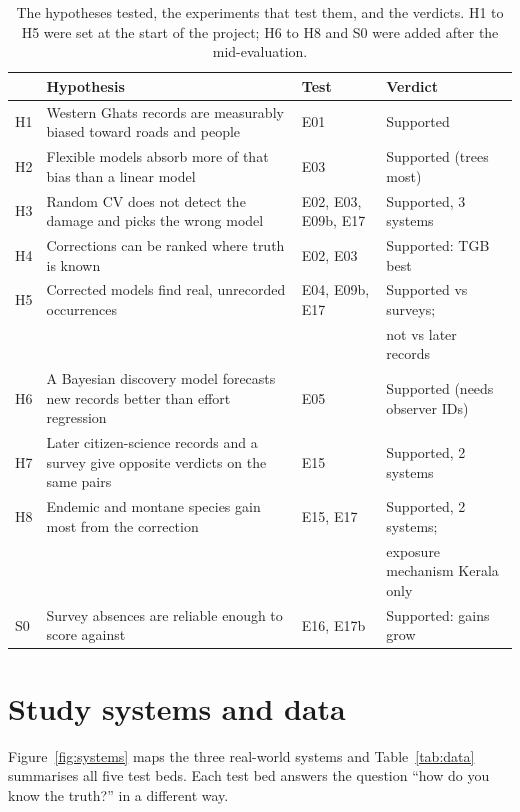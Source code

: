 \documentclass[11pt]{article}
\begin{document}
\begin{table}[htbp]
\centering\small
\caption{The hypotheses tested, the experiments that test them, and the verdicts. H1 to H5 were set at the start of the project; H6 to H8 and S0 were added after the mid-evaluation.}
\label{tab:hyp}
\begin{tabularx}{\textwidth}{@{}l X l l@{}}
\toprule
& Hypothesis & Test & Verdict \\
\midrule
H1 & Western Ghats records are measurably biased toward roads and people & E01 & Supported \\
H2 & Flexible models absorb more of that bias than a linear model & E03 & Supported (trees most) \\
H3 & Random CV does not detect the damage and picks the wrong model & E02, E03, E09b, E17 & Supported, 3 systems \\
H4 & Corrections can be ranked where truth is known & E02, E03 & Supported: TGB best \\
H5 & Corrected models find real, unrecorded occurrences & E04, E09b, E17 & Supported vs surveys; \\
& & & not vs later records \\
H6 & A Bayesian discovery model forecasts new records better than effort regression & E05 & Supported (needs observer IDs) \\
H7 & Later citizen-science records and a survey give opposite verdicts on the same pairs & E15 & Supported, 2 systems \\
H8 & Endemic and montane species gain most from the correction & E15, E17 & Supported, 2 systems; \\
& & & exposure mechanism Kerala only \\
S0 & Survey absences are reliable enough to score against & E16, E17b & Supported: gains grow \\
\bottomrule
\end{tabularx}
\end{table}

\section{Study systems and data}
\label{sec:data}

Figure~\ref{fig:systems} maps the three real-world systems and Table~\ref{tab:data} summarises all five test beds. Each test bed answers the question ``how do you know the truth?'' in a different way.
\end{document}
